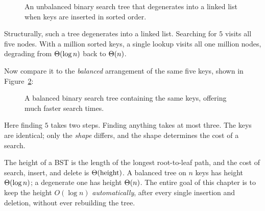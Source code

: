 \begin{figure}[htbp]
\centering
{}
\caption{An unbalanced binary search tree that degenerates into a linked list when keys are inserted in sorted order.}
\label{fig:unbalanced-bst}
\end{figure}

Structurally, such a tree degenerates into a linked list. Searching
for $5$ visits all five nodes. With a million sorted keys, a single lookup visits
all one million nodes, degrading from $\Theta(\log n)$ back to $\Theta(n)$.

Now compare it to the \emph{balanced} arrangement of the same five keys, shown in Figure~\ref{fig:balanced-bst}:

\begin{figure}[htbp]
\centering
{}
\caption{A balanced binary search tree containing the same keys, offering much faster search times.}
\label{fig:balanced-bst}
\end{figure}

Here finding $5$ takes two steps. Finding anything takes at most three. The keys
are identical; only the \emph{shape} differs, and the shape determines the cost of a search.

\begin{focusbox}
The height of a BST is the length of the longest root-to-leaf path, and the cost
of search, insert, and delete is $\Theta(\text{height})$. A balanced tree on $n$
keys has height $\Theta(\log n)$; a degenerate one has height $\Theta(n)$. The entire
goal of this chapter is to keep the height $O(\log n)$ \emph{automatically},
after every single insertion and deletion, without ever rebuilding the tree.
\end{focusbox}

